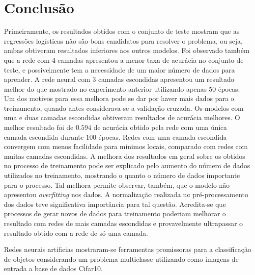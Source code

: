 \documentclass[conference]{IEEEtran}
\begin{document}
\section{Conclusão}

Primeiramente, os resultados obtidos com o conjunto de teste mostram que as regressões logísticas não são bons candidatos para resolver o problema, ou seja, ambas obtiveram resultados inferiores aos outros modelos. Foi observado também que a rede com $4$ camadas apresentou a menor taxa de acurácia no conjunto de teste, e possivelmente tem a necessidade de um maior número de dados para aprender. A rede neural com $3$ camadas escondidas apresentou um resultado melhor do que mostrado no experimento anterior utilizando apenas $50$ épocas. Um dos motivos para essa melhora pode se dar por haver mais dados para o treinamento, quando antes considerava-se a validação cruzada. Os modelos com uma e duas camadas escondidas obtiveram resultados de acurácia melhores. O melhor resultado foi de $0.594$ de acurácia obtido pela rede com uma única camada escondida durante $100$ épocas. Redes com uma camada escondida convergem com menos facilidade para mínimos locais, comparado com redes com muitas camadas escondidas. A melhora dos resultados em geral sobre os obtidos no processo de treinamento pode ser explicado pelo aumento do número de dados utilizados no treinamento, mostrando o quanto o número de dados importante para o processo. Tal melhora permite observar, também, que o modelo não apresentou \emph{overfitting} nos dados. A normalização realizada no pré-processamento dos dados teve significativa importância para tal questão. Acredita-se que processos de gerar novos de dados para treinamento poderiam melhorar o resultado com redes de mais camadas escondidas e provavelmente ultrapassar o resultado obtido com a rede de só uma camada.

Redes neurais artificias mostraram-se ferramentas promissoras para a classificação de objetos considerando um problema multiclasse utilizando como imagens de entrada a base de dados Cifar10.
\end{document}
